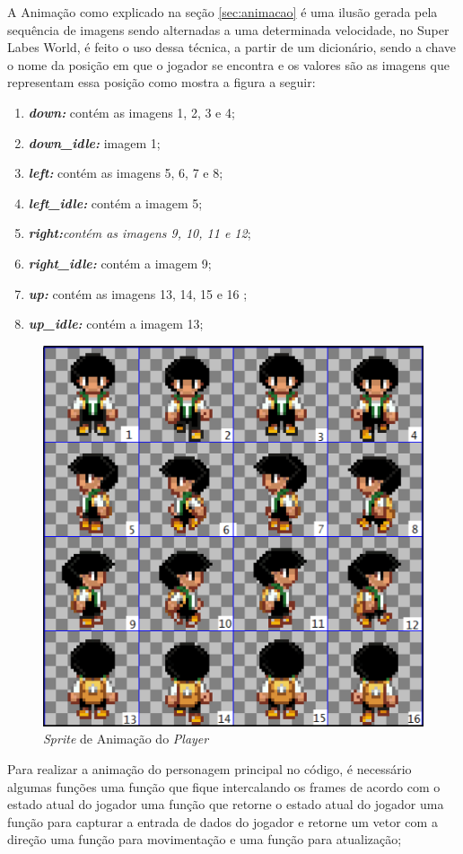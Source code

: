 \clearpage
A Animação como explicado na seção \ref{sec:animacao} é uma ilusão gerada pela sequência de imagens sendo alternadas a uma determinada velocidade,  no Super Labes World, é feito o uso dessa técnica, a partir de um dicionário, sendo a chave o nome da posição em que o jogador se encontra e os valores são as imagens que representam essa posição como mostra a figura a seguir:
\begin{enumerate}
    \item \textit{\textbf{down:}} contém as imagens 1, 2, 3 e 4;
    \item \textit{\textbf{down\_idle:}} imagem 1;
    \item \textit{\textbf{left:}} contém as imagens 5, 6, 7 e 8;
    \item \textit{\textbf{left\_idle:}} contém a imagem 5;
    \item \textit{\textbf{right:}contém as imagens 9, 10, 11 e 12};
    \item \textit{\textbf{right\_idle:}} contém a imagem 9;
    \item \textit{\textbf{up:}} contém as imagens 13, 14, 15 e 16 ;
    \item \textit{\textbf{up\_idle:}} contém a imagem 13;
\end{enumerate}
\begin{figure}[h!]
    \centering
    \includegraphics[width=0.5\linewidth]{figuras/player-animation.png}
    \caption{\textit{Sprite} de Animação do \textit{Player} }
    \label{fig:player-animation}
\end{figure}

Para realizar a animação do personagem principal no código, é necessário algumas funções
uma função que fique intercalando os frames de acordo com o estado atual do jogador
uma função que retorne o estado atual do jogador
uma função para capturar a entrada de dados do jogador e retorne um vetor com a direção
uma função para movimentação
e uma função para atualização;

